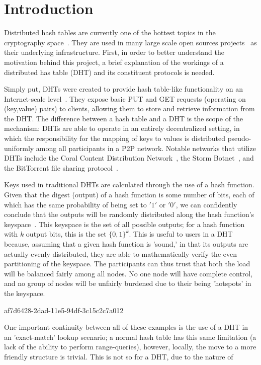 \documentclass[12pt]{article}
\begin{document}
\section{Introduction}
\par Distributed hash tables are currently one of the hottest topics in the cryptography space~\cite{Stoica:2001dj,Rowstron:2001ea,Ratnasamy:2001wn}. They are used in many large scale open sources projects~\cite{Freitas:2013tb,Xu:2010vs,Perfitt:2010fh} as their underlying infrastructure. First, in order to better understand the motivation behind this project, a brief explanation of the workings of a distributed has table (DHT) and its constituent protocols is needed.

\par Simply put, DHTs were created to provide hash table-like functionality on an Internet-scale level~\cite{Ratnasamy:2001wn}. They expose basic PUT and GET requests (operating on (key,value) pairs) to clients, allowing them to store and retrieve information from the DHT. The difference between a hash table and a DHT is the scope of the mechanism: DHTs are able to operate in an entirely decentralized setting, in which the responsibility for the mapping of keys to values is distributed pseudo-uniformly among all participants in a P2P network. Notable networks that utilize DHTs include the Coral Content Distribution Network~\cite{Freedman:2004vb}, the Storm Botnet~\cite{Holz:2008uk}, and the BitTorrent file sharing protocol~\cite{Cohen:y1_8mBnw}.

\par Keys used in traditional DHTs are calculated through the use of a hash function. Given that the digest (output) of a hash function is some number of bits, each of which has the same probability of being set to $'1'$ or $'0'$, we can confidently conclude that the outputs will be randomly distributed along the hash function's keyspace~. This keyspace is the set of all possible outputs; for a hash function with $k$ output bits, this is the set $\{0,1\}^k$. This is useful to users in a DHT because, assuming that a given hash function is 'sound,' in that its outputs are actually evenly distributed, they are able to mathematically verify the even partitioning of the keyspace. The participants can thus trust that both the load will be balanced fairly among all nodes. No one node will have complete control, and no group of nodes will be unfairly burdened due to their being 'hotspots' in the keyspace.~

af7d6428-2dad-11e5-94df-3c15c2c7a012\par One important continuity between all of these examples is the use of a DHT in an 'exact-match' lookup scenario; a normal hash table has this same limitation (a lack of the ability to perform range-queries), however, locally, the move to a more friendly structure is trivial. This is not so for a DHT, due to the nature of
\printbibliography
\end{document}

